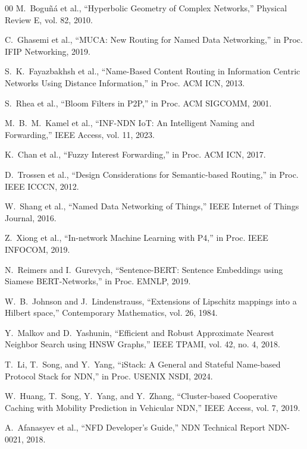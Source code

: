 \documentclass[journal]{IEEEtran}
\begin{document}
\begin{thebibliography}{00}
M.~Bogu{\~n}{\'a} et al., ``Hyperbolic Geometry of Complex Networks,'' Physical Review E, vol. 82, 2010.

C.~Ghasemi et al., ``MUCA: New Routing for Named Data Networking,'' in Proc. IFIP Networking, 2019.

S.~K.~Fayazbakhsh et al., ``Name-Based Content Routing in Information Centric Networks Using Distance Information,'' in Proc. ACM ICN, 2013.

S.~Rhea et al., ``Bloom Filters in P2P,'' in Proc. ACM SIGCOMM, 2001.

M.~B.~M.~Kamel et al., ``INF-NDN IoT: An Intelligent Naming and Forwarding,'' IEEE Access, vol. 11, 2023.

K.~Chan et al., ``Fuzzy Interest Forwarding,'' in Proc. ACM ICN, 2017.

D.~Trossen et al., ``Design Considerations for Semantic-based Routing,'' in Proc. IEEE ICCCN, 2012.

W.~Shang et al., ``Named Data Networking of Things,'' IEEE Internet of Things Journal, 2016.

Z.~Xiong et al., ``In-network Machine Learning with P4,'' in Proc. IEEE INFOCOM, 2019.

N.~Reimers and I.~Gurevych, ``Sentence-BERT: Sentence Embeddings using Siamese BERT-Networks,'' in Proc. EMNLP, 2019.

W.~B.~Johnson and J.~Lindenstrauss, ``Extensions of Lipschitz mappings into a Hilbert space,'' Contemporary Mathematics, vol. 26, 1984.

Y.~Malkov and D.~Yashunin, ``Efficient and Robust Approximate Nearest Neighbor Search using HNSW Graphs,'' IEEE TPAMI, vol. 42, no. 4, 2018.

T.~Li, T.~Song, and Y.~Yang, ``iStack: A General and Stateful Name-based Protocol Stack for NDN,'' in Proc. USENIX NSDI, 2024.

W.~Huang, T.~Song, Y.~Yang, and Y.~Zhang, ``Cluster-based Cooperative Caching with Mobility Prediction in Vehicular NDN,'' IEEE Access, vol. 7, 2019.

A.~Afanasyev et al., ``NFD Developer's Guide,'' NDN Technical Report NDN-0021, 2018.


\end{thebibliography}
\end{document}
